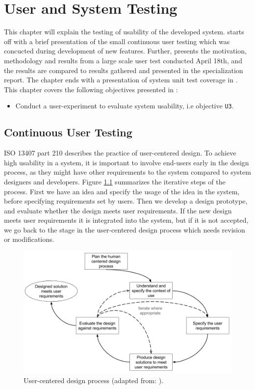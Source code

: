 \chapter{User and System Testing}
\label{ch:testing}
This chapter will explain the testing of usability of the developed system.  starts off with a brief presentation of the small continuous user testing which was concucted during development of new features. Further,  presents the motivation, methodology and results from a large scale user test conducted April 18th, and the results are compared to results gathered and presented in the specialization report. The chapter ends with a presentation of system unit test coverage in . This chapter covers the following objectives presented in :
\begin{itemize}
  \item Conduct a user-experiment to evaluate system usability, i.e objective \texttt{U3}.
\end{itemize}

\section{Continuous User Testing}
\label{sec:cont-user-testing}
ISO 13407 part 210 \cite{iso1999HCD} describes the practice of user-centered design. To achieve high usability in a system, it is important to involve end-users early in the design process, as they might have other requirements to the system compared to system designers and developers. Figure \ref{fig:user-centered-design} summarizes the iterative steps of the process. First we have an idea and specify the usage of the idea in the system, before specifying requirements set by users. Then we develop a design prototype, and evaluate whether the design meets user requirements. If the new design meets user requirements it is integrated into the system, but if it is not accepted, we go back to the stage in the user-centered design process which needs revision or modifications. \\

\begin{figure}
  \centering
  \includegraphics[width=1.0\textwidth]{figs/iterative-design-process.png}
  \caption[User-centered design process]{User-centered design process (adapted from: \cite{iso1999HCD}).}
  \label{fig:user-centered-design}
\end{figure}

